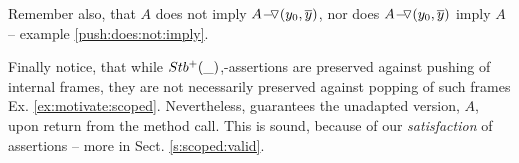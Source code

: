 Remember also, that $A$ does not imply $ \PushASLong {(y_0, \overline y)} {A}$, nor does $ \PushASLong {(y_0, \overline y)}{A}$  imply $A$ -- \cf example \ref{push:does:not:imply}.


Finally notice, that while $\Pos{\_}$,-assertions are preserved against pushing of internal frames, they are not necessarily preserved against popping of such frames \cf Ex. \ref{ex:motivate:scoped}.
Nevertheless, {} guarantees the unadapted version, $A$, 
upon return from the method call. 
This is sound, because of our %
 \emph{\scoped satisfaction} of assertions -- more in Sect.  \ref{s:scoped:valid}.
 




%
%
%




